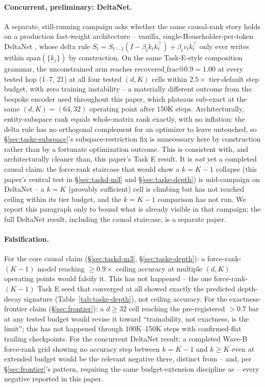 \paragraph{Concurrent, preliminary: DeltaNet.} A separate, still-running
campaign asks whether the same causal-rank story holds on a production
fast-weight architecture -- vanilla, single-Householder-per-token DeltaNet
\citep{schlag2021linear}, whose delta rule $S_t=S_{t-1}(I-\beta_tk_tk_t^\top)
+\beta_tv_tk_t^\top$ only ever writes within $\mathrm{span}(\{k_j\})$ by
construction. On the same Task-E-style composition grammar, the
unconstrained arm reaches $\mathrm{recovered\_frac@0.9}=1.00$ at every
tested hop (1--7, 21) at all four tested $(d,K)$ cells within
$2.5\times$ tier-default step budget, with zero training instability -- a
materially different outcome from the bespoke encoder used throughout this
paper, which plateaus sub-exact at the same $(d,K)=(64,32)$ operating
point after $150$K steps. Architecturally, entity-subspace rank equals
whole-matrix rank exactly, with no inflation: the delta rule has no
orthogonal complement for an optimizer to leave untouched, so
\S\ref{sec:taske-subspace}'s subspace-restriction fix is unnecessary here
by construction rather than by a fortunate optimization outcome. This is
consistent with, and architecturally cleaner than, this paper's Task E
result. It is \emph{not} yet a completed causal claim: the force-rank
staircase that would show a $k{=}K{-}1$ collapse (this paper's central test
in \S\ref{sec:taskd-m3} and \S\ref{sec:taske-depth}) is mid-campaign on
DeltaNet -- a $k{=}K$ (provably sufficient) cell is climbing but has not
reached ceiling within its tier budget, and the $k{=}K{-}1$ comparison has
not run. We report this paragraph only to bound what is already visible in
that campaign; the full DeltaNet result, including the causal staircase, is
a separate paper.

\paragraph{Falsification.} For the core causal claim
(\S\ref{sec:taskd-m3}, \S\ref{sec:taske-depth}): a force-rank-$(K{-}1)$
model reaching $\geq0.9\times$ ceiling accuracy at multiple $(d,K)$
operating points would falsify it. This has not happened -- the one
force-rank-$(K{-}1)$ Task E seed that converged at all showed exactly the
predicted depth-decay signature (Table~\ref{tab:taske-depth}), not ceiling
accuracy. For the exactness-frontier claim (\S\ref{sec:frontier}): a
$d\geq32$ cell reaching the pre-registered $>0.7$ bar at any tested budget
would revise it toward ``trainability, not exactness, is the limit''; this
has not happened through 100K--150K steps with confirmed-flat trailing
checkpoints. For the concurrent DeltaNet result: a completed Wave-B
force-rank grid showing no accuracy step between $k{=}K{-}1$ and $k\geq K$
even at extended budget would be the relevant negative there, distinct
from -- and, per \S\ref{sec:frontier}'s pattern, requiring the same
budget-extension discipline as -- every negative reported in this paper.

